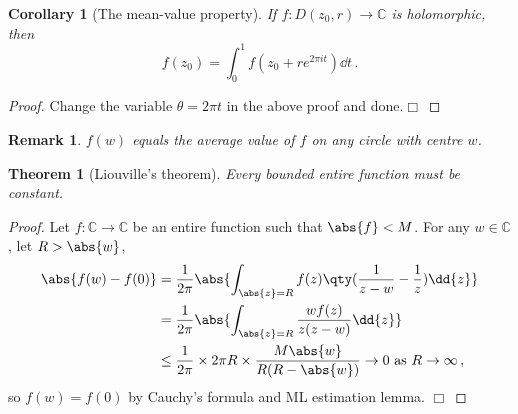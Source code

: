 \documentclass{article}
\theoremstyle{plain}\theoremheaderfont{\normalfont\itshape}\theorembodyfont{\rmfamily}\theoremseparator{.}\newtheorem*{rem}{Remark}\newtheorem*{ex}{Example}\newtheorem*{proof}{Proof}\newtheorem*{altp}{Alternative proof}
\theoremstyle{plain}\theoremheaderfont{\normalfont\bfseries}\theorembodyfont{\rmfamily}\theoremseparator{.}\newtheorem{thm}{Theorem}[section]\newtheorem{lem}[thm]{Lemma}\newtheorem{prop}[thm]{Proposition}\newtheorem*{cor}{Corollary}\newtheorem{defn}[thm]{Definition}\newtheorem{clm}[thm]{Claim}\newtheorem{clminproof}{Claim}
\theoremstyle{break}\theoremheaderfont{\normalfont\itshape}\theorembodyfont{\rmfamily}\theoremseparator{.\medskip}\newtheorem*{proofskip}{Proof}\newtheorem*{exs}{Examples}\newtheorem*{rems}{Remarks}
\theoremstyle{break}\theoremheaderfont{\normalfont\bfseries}\theorembodyfont{\rmfamily}\theoremseparator{.\medskip}\newtheorem{lemskip}[thm]{Lemma}\newtheorem{defnskip}[thm]{Definition}\newtheorem{propskip}[thm]{Proposition}\newtheorem{thmskip}[thm]{Theorem}
\numberwithin{equation}{section}
\newcommand{\qed}{\hfill\ensuremath{\Box}}
\begin{document}
	\begin{cor}[The mean-value property]
		If \(f:D(z_0,r)\to\mathbb{C}\) is holomorphic, then
		\[f(z_0)=\int_{0}^{1}f(z_0+re^{2\pi it})\dd{t}\,.\]
	\end{cor}
	\begin{proof}
		Change the variable \(\theta=2\pi t\) in the above proof and done.\qed
	\end{proof}
	\begin{rem}
		\(f(w)\) equals the average value of \(f\) on any circle with centre \(w\).
	\end{rem}
	\begin{thm}[Liouville's theorem]		
		Every bounded entire function must be constant.
	\end{thm}
	\begin{proof}
		Let \(f:\mathbb{C}\to\mathbb{C}\) be an entire function such that \(\abs{f}<M\). For any \(w\in\mathbb{C}\), let \(R>\abs{w}\),
		\begin{align*}
			\abs{f(w)-f(0)}&=\frac{1}{2\pi}\abs{\int_{\abs{z}=R}f(z)\qty(\frac{1}{z-w}-\frac{1}{z})\dd{z}}\\
			&=\frac{1}{2\pi}\abs{\int_{\abs{z}=R}\frac{wf(z)}{z(z-w)}\dd{z}}\\
			&\le\frac{1}{2\pi}\times 2\pi R\times\frac{M\abs{w}}{R(R-\abs{w})}\to 0\text{ as }R\to\infty\,,
		\end{align*}
		so \(f(w)=f(0)\) by Cauchy's formula and ML estimation lemma. \qed
	\end{proof}
\end{document}

